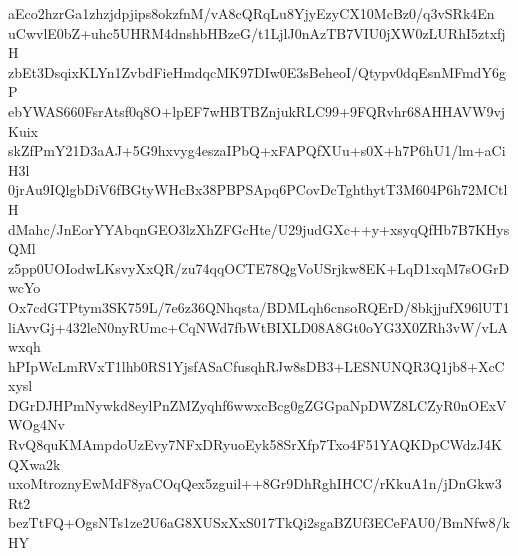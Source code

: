 aEco2hzrGa1zhzjdpjips8okzfnM/vA8cQRqLu8YjyEzyCX10McBz0/q3vSRk4En
uCwvlE0bZ+uhc5UHRM4dnshbHBzeG/t1LjlJ0nAzTB7VIU0jXW0zLURhI5ztxfjH
zbEt3DsqixKLYn1ZvbdFieHmdqcMK97DIw0E3sBeheoI/Qtypv0dqEsnMFmdY6gP
ebYWAS660FsrAtsf0q8O+lpEF7wHBTBZnjukRLC99+9FQRvhr68AHHAVW9vjKuix
skZfPmY21D3aAJ+5G9hxvyg4eszaIPbQ+xFAPQfXUu+s0X+h7P6hU1/lm+aCiH3l
0jrAu9IQlgbDiV6fBGtyWHcBx38PBPSApq6PCovDcTghthytT3M604P6h72MCtlH
dMahc/JnEorYYAbqnGEO3lzXhZFGcHte/U29judGXc++y+xsyqQfHb7B7KHysQMl
z5pp0UOIodwLKsvyXxQR/zu74qqOCTE78QgVoUSrjkw8EK+LqD1xqM7sOGrDwcYo
Ox7cdGTPtym3SK759L/7e6z36QNhqsta/BDMLqh6cnsoRQErD/8bkjjufX96lUT1
liAvvGj+432leN0nyRUmc+CqNWd7fbWtBIXLD08A8Gt0oYG3X0ZRh3vW/vLAwxqh
hPIpWcLmRVxT1lhb0RS1YjsfASaCfusqhRJw8sDB3+LESNUNQR3Q1jb8+XcCxysl
DGrDJHPmNywkd8eylPnZMZyqhf6wwxcBcg0gZGGpaNpDWZ8LCZyR0nOExVWOg4Nv
RvQ8quKMAmpdoUzEvy7NFxDRyuoEyk58SrXfp7Txo4F51YAQKDpCWdzJ4KQXwa2k
uxoMtroznyEwMdF8yaCOqQex5zguil++8Gr9DhRghIHCC/rKkuA1n/jDnGkw3Rt2
bezTtFQ+OgsNTs1ze2U6aG8XUSxXxS017TkQi2sgaBZUf3ECeFAU0/BmNfw8/kHY
